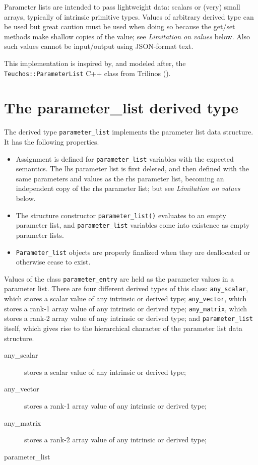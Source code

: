 \documentclass[11pt]{article}
\begin{document}
Parameter lists are intended to pass lightweight data: scalars or (very)
small arrays, typically of intrinsic primitive types.  Values of arbitrary
derived type can be used but great caution must be used when doing so
because the get/set methods make shallow copies of the value; see
\emph{Limitation on values} below.  Also such values cannot be input/output
using JSON-format text.

This implementation is inspired by, and modeled after, the
\texttt{Teuchos::ParameterList} C++ class from Trilinos
().

\section{The parameter_list derived type}
The derived type \texttt{parameter_list} implements the parameter list data
structure.  It has the following properties.
\begin{itemize}
\item
  Assignment is defined for \texttt{parameter_list} variables with the
  expected semantics.  The lhs parameter list is first deleted, and then
  defined with the same parameters and values as the rhs parameter list,
  becoming an independent copy of the rhs parameter list; but see
  \emph{Limitation on values} below.
\item
  The structure constructor \texttt{parameter_list()} evaluates to an
  empty parameter list, and \texttt{parameter_list} variables come into
  existence as empty parameter lists.
\item
  \texttt{Parameter_list} objects are properly finalized when they are
  deallocated or otherwise cease to exist.
\end{itemize}

Values of the class \texttt{parameter_entry} are held as the parameter
values in a parameter list.  There are four different derived types of
this class: \texttt{any_scalar}, which stores a scalar value of any intrinsic
or derived type; \texttt{any_vector}, which stores a rank-1 array value of
any intrinsic or derived type; \texttt{any_matrix}, which stores a rank-2
array value of any intrinsic or derived type; and \texttt{parameter_list}
itself, which gives rise to the hierarchical character of the parameter
list data structure. %

\begin{description}
\item[any_scalar] stores a scalar value of any intrinsic or derived type;
\item[any_vector] stores a rank-1 array value of any intrinsic or derived type;
\item[any_matrix] stores a rank-2 array value of any intrinsic or derived type;
\item[parameter_list]
\end{description}
\end{document}
